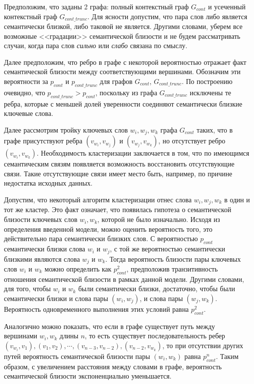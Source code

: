 Предположим, что заданы 2 графа: полный контекстный граф $G_{cont}$ и усеченный контекстный граф $G_{cont\_trunc}$. Для ясности допустим, что пара слов либо является семантически близкой, либо таковой не является. Другими словами, уберем все возможные <<градации>> семантической близости и не будем рассматривать случаи, когда пара слов \emph{сильно} или \emph{слабо} связана по смыслу.
    
Далее предположим, что ребро в графе с некоторой вероятностью отражает факт семантической близости между соответствующими вершинами. Обозначим эти вероятности за $p_{cont}$ и $p_{cont\_trunc}$ для графов $G_{cont}$, $G_{cont\_trunc}$. По построению очевидно, что $p_{cont\_trunc} > p_{cont} $, поскольку из графа $G_{cont\_trunc}$ исключены те ребра, которые с меньшей долей уверенности соединяют семантически близкие ключевые слова.

Далее рассмотрим тройку ключевых слов $w_i, w_j, w_k$ графа $G_{cont}$ таких, что в графе присутствуют ребра $(v_{w_i}, v_{w_j})$ и $(v_{w_j}, v_{w_k})$, но отсутствует ребро $(v_{w_i}, v_{w_k})$. Необходимость кластеризации заключается в том, что по имеющимся семантическим связям появляется возможность восстановить отсутствующие связи. Такие отсутствующие связи имеет место быть, например, по причине недостатка исходных данных.

Допустим, что некоторый алгоритм кластеризации отнес слова $w_i, w_j, w_k$ в один и тот же кластер. Это факт означает, что появилась гипотеза о семантической близости ключевых слов $w_i, w_k$, которой не было изначально. Исходя из определения введенной модели, можно оценить вероятность того, это действительно пара семантически близких слов. С вероятностью $p_{cont}$ семантически близки слова $w_i$ и $w_j$, с той же вероятностью семантически близкими являются слова $w_j$ и $w_k$. Тогда вероятность близости пары ключевых слов $w_i$ и $w_k$ можно определить как $p_{cont}^2$, предположив транзитивность отношения семантической близости в рамках данной модели. Другими словами, для того, чтобы $w_i$ и $w_k$ были семантически близки, достаточно, чтобы были семантически близки и слова пары $(w_i, w_j)$, и слова пары $(w_j, w_k)$. Вероятность одновременного выполнения этих условий равна $p_{cont}^2$.  %

Аналогично можно показать, что если в графе существует путь между вершинами $w_i, w_k$ длины $n$, то есть существует последовательность ребер $(v_{w_i}, v_1), (v_1, v_2), \cdots, (v_{n-3}, v_{n-2}), (v_{n-2}, v_{w_k}) $, то при отсутствии других путей вероятность семантической близости пары $(w_i, w_k)$ равна $p_{cont}^n$. Таким образом, с увеличением расстояния между словами в графе, вероятность семантической близости экспоненциально уменьшается.

